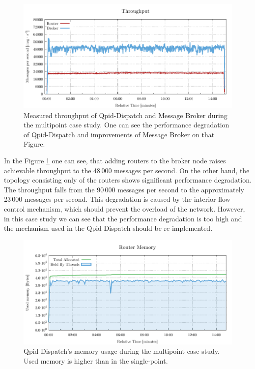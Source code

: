 \begin{figure}[H]
	\centering
	\includegraphics[width=1\linewidth]{obrazky-figures/charts/multipoint-throughput.pdf}
	\caption{Measured throughput of Qpid-Dispatch and Message Broker during the multipoint case study. One can see the performance degradation of Qpid-Dispatch and improvements of Message Broker on that Figure.}
	\label{fig:rate-multipoint-router}
\end{figure}

In the Figure \ref{fig:rate-multipoint-router} one can see, that adding routers to the broker node raises achievable throughput to the 48\,000 messages per second. On the other hand, the topology consisting only of the routers shows significant performance degradation. The throughput falls from the 90\,000 messages per second to the approximately 23\,000 messages per second. This degradation is caused by the interior flow-control mechanism, which should prevent the overload of the network. However, in this case study we can see that the performance degradation is too high and the mechanism used in the Qpid-Dispatch should be re-implemented.


\begin{figure}[H]
	\centering
	\includegraphics[width=1\linewidth]{obrazky-figures/charts/multipoint-router-only-throughput-memory.pdf}
	\caption{Qpid-Dispatch's memory usage during the multipoint case study. Used memory is higher than in the single-point.}
	\label{fig:router-multipoint-memory}
\end{figure}

